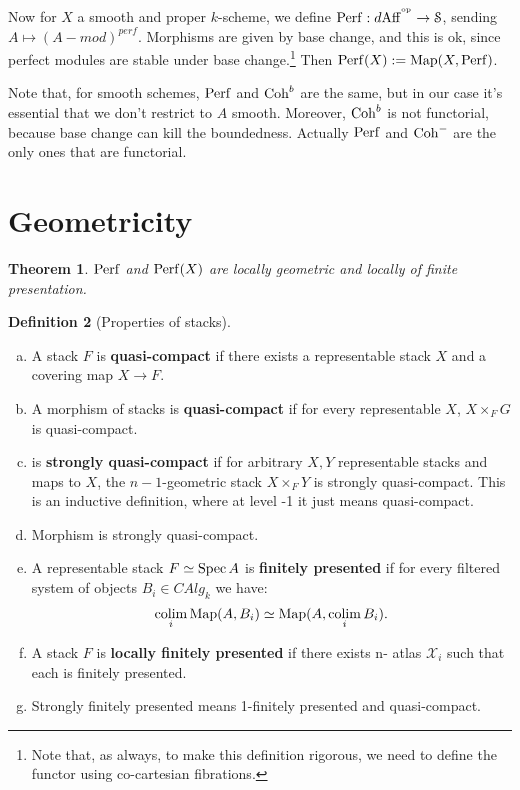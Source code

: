\documentclass[10pt,a4paper,reqno,oneside]{book} %
\theoremstyle{plain}
\newtheorem{thm}{Theorem}[section]
\theoremstyle{definition}
\newtheorem{defin}[thm]{Definition}
\theoremstyle{remark}
\numberwithin{equation}{section}
\begin{document}
Now for $X$ a smooth and proper $k$-scheme, we define $\mathrm{Perf} : d\mathrm{Aff}^{^\mathrm{op}} \to \mathcal S$, sending $A \mapsto (A-mod)^{perf}$.
Morphisms are given by base change, and this is ok, since perfect modules are stable under base change.\footnote{Note that,
as always, to make this definition rigorous, we need to define the functor using co-cartesian fibrations.}
Then $\mathrm{Perf}(X) := \operatorname{Map}(X, \mathrm{Perf})$.

Note that, for smooth schemes, $\mathrm{Perf}$ and $\mathrm{Coh}^b$ are the same, but in our case it's essential that we don't restrict to $A$
smooth. Moreover, $\mathrm{Coh}^b$ is not functorial, because base change can kill the boundedness. Actually $\mathrm{Perf}$ and $\mathrm{Coh}^-$ are
the only ones that are functorial.


\section{Geometricity}
\begin{thm}
$\mathrm{Perf}$ and $\mathrm{Perf}(X)$ are locally geometric and locally of finite presentation.
\end{thm}

\begin{defin}[Properties of stacks]
\begin{enumerate}[(a)]
\item A stack $F$ is \textbf{quasi-compact} if there exists a representable stack $X$ and a covering map $X \to F$.
\item A morphism of stacks is \textbf{quasi-compact} if for every representable $X$, $X \times_F G$ is quasi-compact.
\item is \textbf{strongly quasi-compact} if for arbitrary $X, Y$ representable stacks and maps to $X$, the $n-1$-geometric
stack $X \times_F Y$ is strongly quasi-compact. This is an inductive definition, where at level -1 it just means quasi-compact.
\item Morphism is strongly quasi-compact.
\item A representable stack $F \simeq \operatorname{Spec} A$ is \textbf{finitely presented} if for every filtered system of objects
$B_i \in CAlg_k$ we have:
\[	\operatorname*{colim}_i \operatorname{Map}(A,B_i) \simeq \operatorname{Map}(A, \operatorname*{colim}_i B_i).	\]
\item A stack $F$ is \textbf{locally finitely presented} if there exists n- atlas $\mathcal{X}_i$ such that each is
finitely presented.
\item Strongly finitely presented means 1-finitely presented and quasi-compact.
\end{enumerate}
\end{defin}
\end{document}

